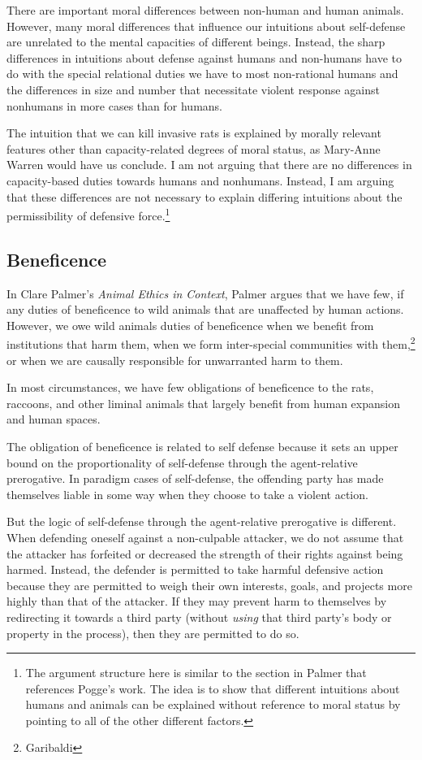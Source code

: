 	There are important moral differences between non-human and human animals.
	However, many moral differences that influence our intuitions about
	self-defense are unrelated to the mental capacities of different beings.
	Instead, the sharp differences in intuitions about defense against humans
	and non-humans have to do with the special relational duties we have to
	most non-rational humans and the differences in size and number that
	necessitate violent response against nonhumans in more cases than for
	humans.

	The intuition that we can kill invasive rats is explained by morally relevant
	features other than capacity-related degrees of moral status, as
	Mary-Anne Warren would have us conclude.  I am not arguing that there are
	no differences in capacity-based duties towards humans and nonhumans.
	Instead, I am arguing that these differences are not necessary to explain
	differing intuitions about the permissibility of defensive
	force.\footnote{The argument structure here is similar to the section in
		Palmer that references Pogge’s work. The idea is to show that different
	intuitions about humans and animals can be explained without reference to
	moral status by pointing to all of the other different factors.}

    \subsection{Beneficence}

		In Clare Palmer’s \emph{Animal Ethics in Context}, Palmer argues that
		we have few, if any duties of beneficence to wild animals that are
		unaffected by human actions. However, we owe wild animals duties of
		beneficence when we benefit from institutions that harm them, when we
		form inter-special communities with them,\footnote{Garibaldi} or when
		we are causally responsible for unwarranted harm to them.

		In most circumstances, we have few obligations of beneficence to the
		rats, raccoons, and other liminal animals that largely benefit from
		human expansion and human spaces.

		The obligation of beneficence is related to self defense because it sets
		an upper bound on the proportionality of self-defense through the
		agent-relative prerogative. In paradigm cases of self-defense, the
		offending party has made themselves liable in some way when they choose
		to take a violent action.

		But the logic of self-defense through the agent-relative prerogative is
		different. When defending oneself against a non-culpable attacker, we do
		not assume that the attacker has forfeited or decreased the strength
		of their rights against being harmed. Instead, the defender is
		permitted to take harmful defensive action because they are permitted
		to weigh their own interests, goals, and projects more highly than that
		of the attacker. If they may prevent harm to themselves by redirecting
		it towards a third party (without \emph{using} that third party’s body
		or property in the process), then they are permitted to do so.

